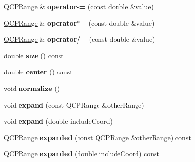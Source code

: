 \begin{DoxyCompactItemize}
\item 
\mbox{\label{class_q_c_p_range_a279a67cbd92d2336a39be0cfdd1d3144}} 
\hyperlink{class_q_c_p_range}{Q\+C\+P\+Range} \& {\bfseries operator-\/=} (const double \&value)
\item 
\mbox{\label{class_q_c_p_range_a1eda96ee1c350db3fb502f8a52836664}} 
\hyperlink{class_q_c_p_range}{Q\+C\+P\+Range} \& {\bfseries operator$\ast$=} (const double \&value)
\item 
\mbox{\label{class_q_c_p_range_a80e0e1ea39325b7f98dbec27526f2dd3}} 
\hyperlink{class_q_c_p_range}{Q\+C\+P\+Range} \& {\bfseries operator/=} (const double \&value)
\item 
\mbox{\label{class_q_c_p_range_a62326e7cc4316b96df6a60813230e63f}} 
double {\bfseries size} () const
\item 
\mbox{\label{class_q_c_p_range_af57d4a37a45d0101177ca30fae5d4ca8}} 
double {\bfseries center} () const
\item 
\mbox{\label{class_q_c_p_range_af914a7740269b0604d0827c634a878a9}} 
void {\bfseries normalize} ()
\item 
\mbox{\label{class_q_c_p_range_a0fa1bc8048be50d52bea93a8caf08305}} 
void {\bfseries expand} (const \hyperlink{class_q_c_p_range}{Q\+C\+P\+Range} \&other\+Range)
\item 
\mbox{\label{class_q_c_p_range_a5fa977db0a4b7800075c629c62cf5e80}} 
void {\bfseries expand} (double include\+Coord)
\item 
\mbox{\label{class_q_c_p_range_a9cbfb7cd06eac1839cae981e05c19633}} 
\hyperlink{class_q_c_p_range}{Q\+C\+P\+Range} {\bfseries expanded} (const \hyperlink{class_q_c_p_range}{Q\+C\+P\+Range} \&other\+Range) const
\item 
\mbox{\label{class_q_c_p_range_af81d70f1add7233d73a19dcbe5decb2e}} 
\hyperlink{class_q_c_p_range}{Q\+C\+P\+Range} {\bfseries expanded} (double include\+Coord) const
\item 

\end{DoxyCompactItemize}
